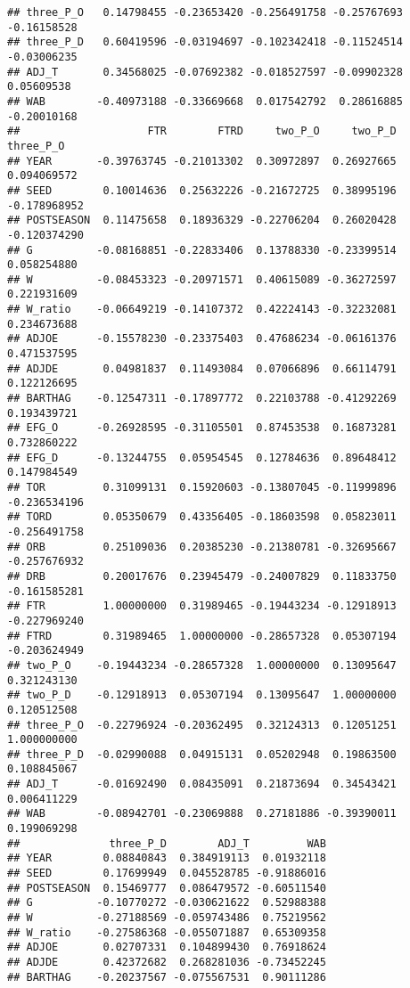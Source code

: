 \documentclass[
]{article}
\begin{document}
\begin{verbatim}
## three_P_O   0.14798455 -0.23653420 -0.256491758 -0.25767693 -0.16158528
## three_P_D   0.60419596 -0.03194697 -0.102342418 -0.11524514 -0.03006235
## ADJ_T       0.34568025 -0.07692382 -0.018527597 -0.09902328  0.05609538
## WAB        -0.40973188 -0.33669668  0.017542792  0.28616885 -0.20010168
##                    FTR        FTRD     two_P_O     two_P_D    three_P_O
## YEAR       -0.39763745 -0.21013302  0.30972897  0.26927665  0.094069572
## SEED        0.10014636  0.25632226 -0.21672725  0.38995196 -0.178968952
## POSTSEASON  0.11475658  0.18936329 -0.22706204  0.26020428 -0.120374290
## G          -0.08168851 -0.22833406  0.13788330 -0.23399514  0.058254880
## W          -0.08453323 -0.20971571  0.40615089 -0.36272597  0.221931609
## W_ratio    -0.06649219 -0.14107372  0.42224143 -0.32232081  0.234673688
## ADJOE      -0.15578230 -0.23375403  0.47686234 -0.06161376  0.471537595
## ADJDE       0.04981837  0.11493084  0.07066896  0.66114791  0.122126695
## BARTHAG    -0.12547311 -0.17897772  0.22103788 -0.41292269  0.193439721
## EFG_O      -0.26928595 -0.31105501  0.87453538  0.16873281  0.732860222
## EFG_D      -0.13244755  0.05954545  0.12784636  0.89648412  0.147984549
## TOR         0.31099131  0.15920603 -0.13807045 -0.11999896 -0.236534196
## TORD        0.05350679  0.43356405 -0.18603598  0.05823011 -0.256491758
## ORB         0.25109036  0.20385230 -0.21380781 -0.32695667 -0.257676932
## DRB         0.20017676  0.23945479 -0.24007829  0.11833750 -0.161585281
## FTR         1.00000000  0.31989465 -0.19443234 -0.12918913 -0.227969240
## FTRD        0.31989465  1.00000000 -0.28657328  0.05307194 -0.203624949
## two_P_O    -0.19443234 -0.28657328  1.00000000  0.13095647  0.321243130
## two_P_D    -0.12918913  0.05307194  0.13095647  1.00000000  0.120512508
## three_P_O  -0.22796924 -0.20362495  0.32124313  0.12051251  1.000000000
## three_P_D  -0.02990088  0.04915131  0.05202948  0.19863500  0.108845067
## ADJ_T      -0.01692490  0.08435091  0.21873694  0.34543421  0.006411229
## WAB        -0.08942701 -0.23069888  0.27181886 -0.39390011  0.199069298
##              three_P_D        ADJ_T         WAB
## YEAR        0.08840843  0.384919113  0.01932118
## SEED        0.17699949  0.045528785 -0.91886016
## POSTSEASON  0.15469777  0.086479572 -0.60511540
## G          -0.10770272 -0.030621622  0.52988388
## W          -0.27188569 -0.059743486  0.75219562
## W_ratio    -0.27586368 -0.055071887  0.65309358
## ADJOE       0.02707331  0.104899430  0.76918624
## ADJDE       0.42372682  0.268281036 -0.73452245
## BARTHAG    -0.20237567 -0.075567531  0.90111286

\end{verbatim}
\end{document}
